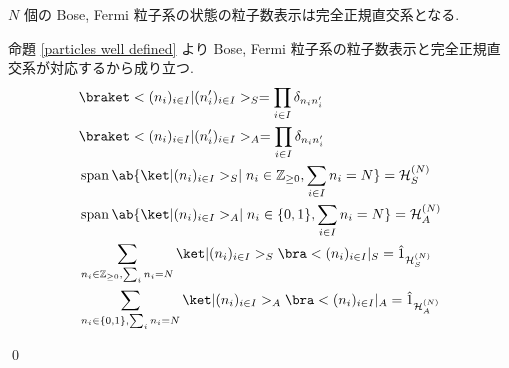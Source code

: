 \documentclass[uplatex,dvipdfmx,a4paper,11pt]{jlreq}
\makeatletter
\DeclareMathOperator{\Span}{span}
\newcommand{\ZZ}{\mathbb{Z}}
\newcommand{\HH}{\mathcal{H}}
\numberwithin{equation}{section}
\theoremstyle{definition}
\renewenvironment{proof}[1][\proofname]{\par
  \normalfont
  \topsep6\p@\@plus6\p@ \trivlist
  \item[\hskip\labelsep{\bfseries #1}\@addpunct{\bfseries}]\ignorespaces\quad\par
}{
  \qed\endtrivlist\@endpefalse
}
\renewcommand\proofname{証明}
\makeatother
\begin{document}
\begin{theorem}
  $N$ 個の Bose, Fermi 粒子系の状態の粒子数表示は完全正規直交系となる.
  \label{Fermi N character}
\end{theorem}
\begin{proof}
  命題 \ref{particles well defined} より Bose, Fermi 粒子系の粒子数表示と完全正規直交系が対応するから成り立つ.
  \begin{align}
     & \braket<(n_i)_{i\in I}|(n_i')_{i\in I}>_S = \prod_{i\in I}\delta_{n_in_i'}                                    \\
     & \braket<(n_i)_{i\in I}|(n_i')_{i\in I}>_A = \prod_{i\in I}\delta_{n_in_i'}                                    \\
     & \Span\ab\{\ket|(n_i)_{i\in I}>_S \mid n_i\in\ZZ_{\geq 0}, \sum_{i\in I}n_i = N \} = \HH_S^{(N)}               \\
     & \Span\ab\{\ket|(n_i)_{i\in I}>_A \mid n_i\in\{0, 1\}, \sum_{i\in I}n_i = N \} = \HH_A^{(N)}                   \\
     & \sum_{n_i\in\ZZ_{\geq 0}, \sum_i n_i = N}\ket|(n_i)_{i\in I}>_S\bra<(n_i)_{i\in I}|_S = \hat{1}_{\HH_S^{(N)}} \\
     & \sum_{n_i\in\{0, 1\}, \sum_i n_i = N} \ket|(n_i)_{i\in I}>_A\bra<(n_i)_{i\in I}|_A = \hat{1}_{\HH_A^{(N)}}
  \end{align}
\end{proof}
\end{document}
